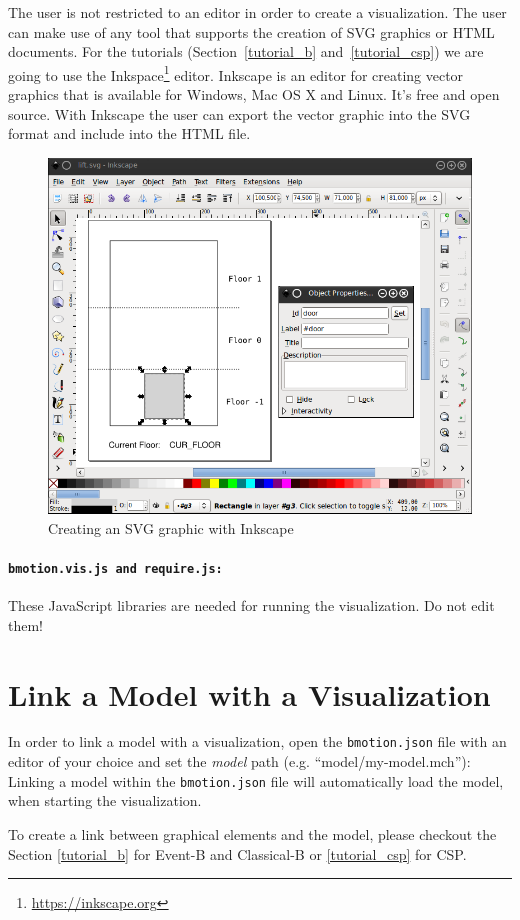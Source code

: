 The user is not restricted to an editor in order to create a visualization.
The user can make use of any tool that supports the creation of SVG graphics or HTML documents.
For the tutorials (Section~\ref{tutorial_b} and~\ref{tutorial_csp}) we are going to use the Inkspace\footnote{\url{https://inkscape.org}} editor. Inkscape is an editor for creating vector graphics that is available for Windows, Mac OS X and Linux.
It's free and open source.
With Inkscape the user can export the vector graphic into the SVG format and include into the HTML file.

\begin{figure}[!ht]
\begin{center}
	\includegraphics[width=12cm]{img/tutorial/tut_02.png}
	\caption{Creating an SVG graphic with Inkscape}
	\label{fig_tut_02_inkscape}
\end{center}
\end{figure} 

\paragraph{\texttt{bmotion.vis.js and require.js:}}
These JavaScript libraries are needed for running the visualization.
Do not edit them!

\section{Link a Model with a Visualization}

In order to link a model with a visualization, open the \texttt{bmotion.json} file with an editor of your choice and set the \textit{model} path (e.g. ``model/my-model.mch''):
Linking a model within the \texttt{bmotion.json} file will automatically load the model, when starting the visualization.

To create a link between graphical elements and the model, please checkout the Section \ref{tutorial_b} for Event-B and Classical-B or \ref{tutorial_csp} for CSP.
